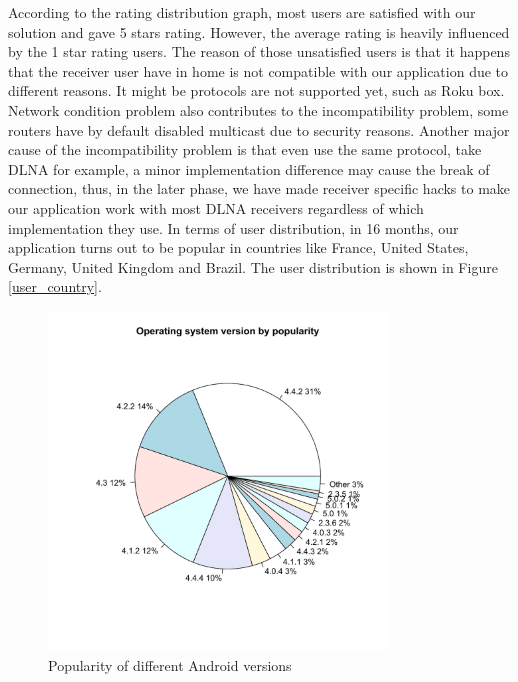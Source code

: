 According to the rating distribution graph, most users are satisfied with our solution and gave 5 stars rating. However, the average rating is heavily influenced by the 1 star rating users. The reason of those unsatisfied users is that it happens that the receiver user have in home is not compatible with our application due to different reasons. It might be protocols are not supported yet, such as Roku box. Network condition problem also contributes to the incompatibility problem, some routers have by default disabled multicast due to security reasons. Another major cause of the incompatibility problem is that even use the same protocol, take DLNA for example, a minor implementation difference may cause the break of connection, thus, in the later phase, we have made receiver specific hacks to make our application work with most DLNA receivers regardless of which implementation they use.
In terms of user distribution, in 16 months, our application turns out to be popular in countries like France, United States, Germany, United Kingdom and Brazil. The user distribution is shown in Figure \ref{user_country}.
\begin{figure}[htb]
\centering \includegraphics[height=9cm]{charts/os_version_popularity}
\caption{Popularity of different Android versions \label{os_versions}}
\end{figure}

